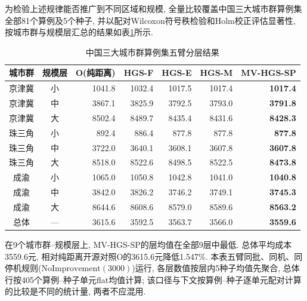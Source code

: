 \documentclass{setp-new}
\newcommand{\setptabsetup}{\fontsize{9pt}{10.5pt}\selectfont\renewcommand{\arraystretch}{0.95}\setlength{\tabcolsep}{2.2pt}\setlength{\aboverulesep}{0.4pt}\setlength{\belowrulesep}{0.4pt}\hbadness=10000}
\begin{document}
为检验上述规律能否推广到不同区域和规模,
全量比较覆盖中国三大城市群算例集全部81个算例及5个种子,
并以配对Wilcoxon符号秩检验和Holm校正评估显著性,
按城市群与规模层汇总的结果如表\ref{tab:china81-summary}所示.

\begin{table}[H]
\centering
\caption{中国三大城市群算例集五臂分层结果}
\label{tab:china81-summary}
\setptabsetup
\begin{tabular*}{\linewidth}{@{\extracolsep{\fill}}ccrrrrr@{}}
\toprule
城市群 & 规模层 & O(纯距离) & HGS-F & HGS-E & HGS-M & MV-HGS-SP\\
\midrule
京津冀 & 小 & 1041.8 & 1032.4 & 1017.5 & 1017.4 & \textbf{1017.4} \\
京津冀 & 中 & 3867.1 & 3825.9 & 3792.5 & 3793.0 & \textbf{3791.8} \\
京津冀 & 大 & 8502.4 & 8489.7 & 8435.4 & 8431.6 & \textbf{8428.3} \\
珠三角 & 小 & 892.4 & 886.4 & 877.8 & 877.8 & \textbf{877.8} \\
珠三角 & 中 & 3722.0 & 3640.1 & 3608.1 & 3607.8 & \textbf{3607.8} \\
珠三角 & 大 & 8518.0 & 8522.6 & 8498.5 & 8522.5 & \textbf{8473.8} \\
成渝 & 小 & 1065.0 & 1050.8 & 1042.8 & 1041.0 & \textbf{1040.8} \\
成渝 & 中 & 3842.0 & 3826.2 & 3746.2 & 3749.1 & \textbf{3745.3} \\
成渝 & 大 & 8644.6 & 8608.6 & 8579.0 & 8589.6 & \textbf{8563.2} \\
\midrule
总体 & --- & 3615.6 & 3592.5 & 3563.7 & 3566.0 & \textbf{3559.6} \\
\bottomrule
\end{tabular*}
\end{table}

在9个城市群--规模层上, MV-HGS-SP的层均值在全部9层中最低.
总体平均成本3559.6元, 相对纯距离开源对照O的3615.6元降低1.547\%.
本表五臂同批、同机、同停机规则($\mathrm{NoImprovement}(3000)$)运行,
各层数值按层内5种子均值先聚合, 总体行按405个算例--种子单元flat均值计算;
该口径与下文按算例--种子逐单元配对计算的比较是不同的统计量, 两者不应混用.
\end{document}
